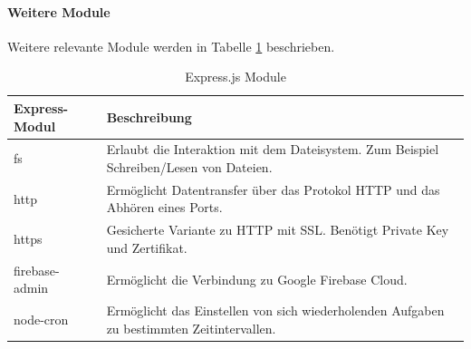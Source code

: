 \paragraph{Weitere Module}
Weitere relevante Module werden in Tabelle \ref{tab:ExpressModule} beschrieben.
\begin{table}[h]
\caption{Express.js Module}
\label{tab:ExpressModule}
\begin{center}
    \begin{tabular}{l p{8cm}}
	 \toprule
    \textbf{Express-Modul} & \textbf{Beschreibung} \\ 
    \midrule
    fs & Erlaubt die Interaktion mit dem Dateisystem.\newline
	Zum Beispiel Schreiben/Lesen von Dateien.\\
    
    http & Ermöglicht Datentransfer über das Protokol HTTP und das Abhören eines Ports.  \\
    
	https & Gesicherte Variante zu HTTP mit SSL.\newline
	Benötigt Private Key und Zertifikat.  \\
    firebase-admin & Ermöglicht die Verbindung zu Google Firebase Cloud. \\ 
        
    node-cron & Ermöglicht das Einstellen von sich wiederholenden Aufgaben zu bestimmten Zeitintervallen.  \\
    \bottomrule
    \end{tabular}
\end{center}
\end{table}

